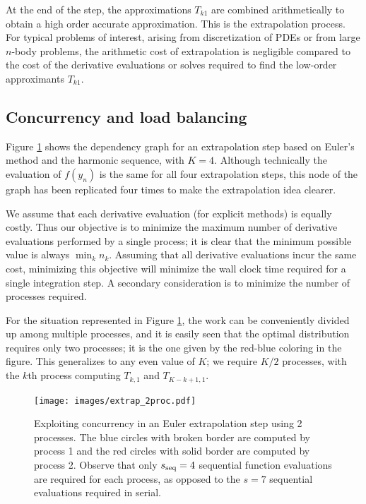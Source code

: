\documentclass[12pt]{article}
\newcommand{\spar}{s_\textup{seq}}
\begin{document}
At the end of the step, the approximations $T_{k1}$ are combined
arithmetically to obtain a high order accurate approximation.
This is the extrapolation process.
For typical problems of interest, arising from discretization of PDEs or
from large $n$-body problems, the arithmetic cost of extrapolation is
negligible compared to the cost of the derivative evaluations or
solves required to find the low-order approximants $T_{k1}$.

\subsection{Concurrency and load balancing}
Figure \ref{fig:extrap_2proc} shows the dependency graph for an
extrapolation step based on Euler's method and the harmonic sequence, with
$K=4$.  Although technically the evaluation of $f(y_n)$ is the same
for all four extrapolation steps, this node of the graph has been
replicated four times to make the extrapolation idea clearer.

We assume that each derivative evaluation (for explicit methods)
is equally costly.  Thus
our objective is to minimize the maximum number of
derivative evaluations performed by a single process; it is clear
that the minimum possible value is always $\min_k n_k$.
Assuming that all derivative evaluations incur the same cost, minimizing
this objective will minimize the wall clock time required for a single
integration step.  A secondary consideration is to minimize the number
of processes required.

For the situation represented in Figure \ref{fig:extrap_2proc}, 
the work can be conveniently divided up among multiple processes,
and it is easily seen that the optimal distribution requires only 
two processes; it is the one given by the red-blue coloring in the figure.
This generalizes to any even value of $K$; we require $K/2$ processes, with
the $k$th process computing $T_{k,1}$ and $T_{K-k+1,1}$.

    \begin{figure}
    \begin{center}
    \texttt{[image: images/extrap\_2proc.pdf]}
    \caption {Exploiting concurrency in an Euler extrapolation step using 2 processes.
    The blue circles with broken border are computed by process 1 and the red
    circles with solid border are computed by process 2.  Observe that only $\spar=4$
    sequential function evaluations are required for each process, as opposed to
    the $s=7$ sequential evaluations required in serial.
    \label{fig:extrap_2proc}}
    \end{center}
    \end{figure}
\end{document}
